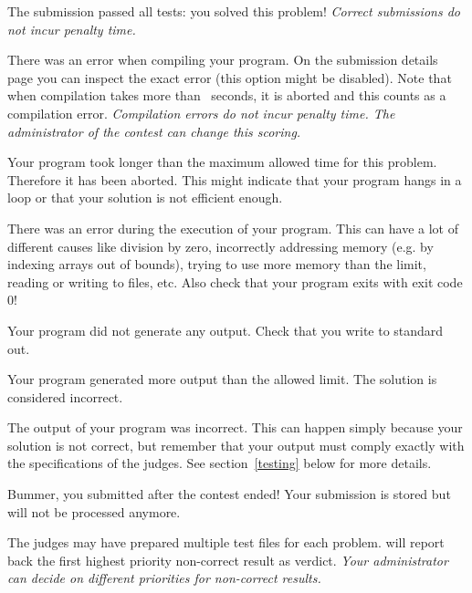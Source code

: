 \begin{description}[\setleftmargin{4.5cm}]
\item[CORRECT]
The submission passed all tests: you solved this problem!
\textit{Correct submissions do not incur penalty time.}

\item[COMPILER-ERROR]
There was an error when compiling your program. On the submission
details page you can inspect the exact error (this option might be
disabled).
Note that when compilation takes more than \COMPILETIME\ seconds, it is aborted and
this counts as a compilation error.
\textit{Compilation errors do not incur penalty time. The administrator of the contest can change this scoring.}

\item[TIMELIMIT]
Your program took longer than the maximum allowed time for this
problem. Therefore it has been aborted. This might indicate that your
program hangs in a loop or that your solution is not efficient
enough.

\item[RUN-ERROR]
There was an error during the execution of your program. This can have
a lot of different causes like division by zero, incorrectly
addressing memory (e.g. by indexing arrays out of bounds), trying to
use more memory than the limit, reading or writing to files, etc.
Also check that your program exits with exit code 0!

\item[NO-OUTPUT]
Your program did not generate any output. Check that you write to
standard out.

\item[OUTPUT-LIMIT]
Your program generated more output than the allowed limit. The
solution is considered incorrect.

\item[WRONG-ANSWER]
The output of your program was incorrect. This can happen simply
because your solution is not correct, but remember that your output
must comply exactly with the specifications of the judges. See
section~\ref{testing} below for more details.

\item[TOO-LATE]
Bummer, you submitted after the contest ended! Your submission is
stored but will not be processed anymore.
\end{description}

The judges may have prepared multiple test files for each
problem. \DOMjudge will report back the first highest priority
non-correct result as verdict.
\textit{Your administrator can decide on different priorities
for non-correct results.}

